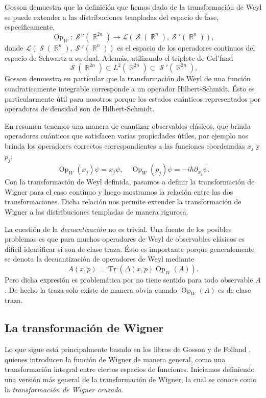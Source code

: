 \documentclass[a4paper]{report}
\DeclareMathOperator{\R}{\mathbb{R}}
\DeclareMathOperator{\Sz}{\mathcal S}
\DeclareMathOperator{\Tr}{Tr}
\DeclareMathOperator{\Op}{Op}
\begin{document}
  Gosson demuestra que la definición que hemos dado de la
  transformación de Weyl se puede extender a las
  distribuciones templadas del espacio de fase,
  específicamente, 
  \[
    \Op_W : \Sz'(\R^{2n}) \to \mathcal
    L(\Sz(\R^{n}),\Sz'(\R^{n})),
  \]
  donde $\mathcal L(\Sz(\R^{n}),\Sz'(\R^{n}))$ es el espacio
  de los operadores continuos del espacio de Schwartz a su
  dual. Además, utilizando el triplete de Gel'fand
  \[
    \Sz(\R^{2n})
    \subset L^2(\R^{2n})
    \subset \Sz'(\R^{2n}),
  \]
  Gosson demuestra en partícular que la transformación de
  Weyl de una función cuadraticamente integrable corresponde
  a un operador Hilbert-Schmidt. Ésto es particularmente
  útil para nosotros porque los estados cuánticos
  representados por operadores de densidad son de
  Hilbert-Schmidt.

  En resumen tenemos una manera de cuantizar observables
  clásicos, que brinda operadores cuánticos que satisfacen
  varias propiedades útiles, por ejemplo nos brinda los
  operadores correctos correspondientes a las funciones
  coordenadas
  $x_j$ y $p_j$:
  \begin{equation}
    \Op_W(x_j)\psi = x_j\psi,
    \quad
    \Op_W(p_j)\psi = -i\hbar \partial_{x_j}\psi.
  \end{equation}
  Con la transformación de Weyl definida, pasamos a definir
  la transformación de Wigner para el caso continuo y luego
  mostramos la relación entre las dos transformaciones.
  Dicha relación nos permite extender la transformación de
  Wigner a las distribuciones templadas de manera rigurosa.

  La cuestión de la \textit{decuantización} no es trivial.
  Una fuente de los posibles problemas es que para muchos
  operadores de Weyl de observables clásicos es dificil
  identificar si son de clase traza. Ésto es importante
  porque generalemente se denota la decuantización de
  operadores de Weyl mediante
  \[
    A(x,p)
    = \Tr\left( \Delta(x,p) \Op_W(A) \right). 
  \] 
  Pero dicha expresión es problemática por no tiene sentido
  para todo observable $A$. De hecho la traza solo existe de
  manera obvia cuando $\Op_W(A)$ es de clase traza.

  

  

  \subsection{La transformación de Wigner}

  Lo que sigue está principalmente basado en los libros de
  Gosson \cite{gossonWignerTransform2017} y de Folland
  \cite{follandHarmonicAnalysisPhase1989}, quienes
  introducen la función de Wigner de manera general, como
  una transformación integral entre ciertos espacios de
  funciones. Iniciamos definiendo una versión más general de
  la transformación de Wigner, la cual se conoce como la
  \textit{transformación de Wigner cruzada}. 
\end{document}
